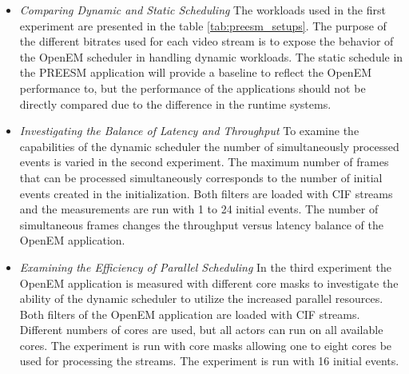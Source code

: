 \begin{itemize}
    \item \textit{Comparing Dynamic and Static Scheduling}
    The workloads used in the first experiment are presented in the table \ref{tab:preesm_setups}. The purpose of the different bitrates used for each video stream is to expose the behavior of the OpenEM scheduler in handling dynamic workloads. The static schedule in the PREESM application will provide a baseline to reflect the OpenEM performance to, but the performance of the applications should not be directly compared due to the difference in the runtime systems.

\item \textit{Investigating the Balance of Latency and Throughput}
To examine the capabilities of the dynamic scheduler the number of simultaneously processed events is varied in the second experiment. The maximum number of frames that can be processed simultaneously corresponds to the number of initial events created in the initialization. Both filters are loaded with CIF streams and the measurements are run with 1 to 24 initial events. The number of simultaneous frames changes the throughput versus latency balance of the OpenEM application.

\item \textit{Examining the Efficiency of Parallel Scheduling}
In the third experiment the OpenEM application is measured with different core masks to investigate the ability of the dynamic scheduler to utilize the increased parallel resources. Both filters of the OpenEM application are loaded with CIF streams. Different numbers of cores are used, but all actors can run on all available cores. The experiment is run with core masks allowing one to eight cores be used for processing the streams. The experiment is run with 16 initial events.
\end{itemize}
